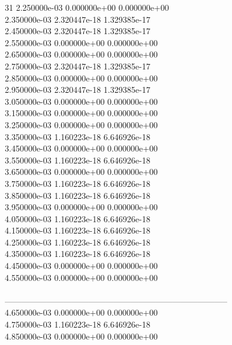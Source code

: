 31	2.250000e-03	0.000000e+00	0.000000e+00	\\ 	2.350000e-03	2.320447e-18	1.329385e-17	\\ 	2.450000e-03	2.320447e-18	1.329385e-17	\\ 	2.550000e-03	0.000000e+00	0.000000e+00	\\ 	2.650000e-03	0.000000e+00	0.000000e+00	\\ 	2.750000e-03	2.320447e-18	1.329385e-17	\\ 	2.850000e-03	0.000000e+00	0.000000e+00	\\ 	2.950000e-03	2.320447e-18	1.329385e-17	\\ 	3.050000e-03	0.000000e+00	0.000000e+00	\\ 	3.150000e-03	0.000000e+00	0.000000e+00	\\ 	3.250000e-03	0.000000e+00	0.000000e+00	\\ 	3.350000e-03	1.160223e-18	6.646926e-18	\\ 	3.450000e-03	0.000000e+00	0.000000e+00	\\ 	3.550000e-03	1.160223e-18	6.646926e-18	\\ 	3.650000e-03	0.000000e+00	0.000000e+00	\\ 	3.750000e-03	1.160223e-18	6.646926e-18	\\ 	3.850000e-03	1.160223e-18	6.646926e-18	\\ 	3.950000e-03	0.000000e+00	0.000000e+00	\\ 	4.050000e-03	1.160223e-18	6.646926e-18	\\ 	4.150000e-03	1.160223e-18	6.646926e-18	\\ 	4.250000e-03	1.160223e-18	6.646926e-18	\\ 	4.350000e-03	1.160223e-18	6.646926e-18	\\ 	4.450000e-03	0.000000e+00	0.000000e+00	\\ 	4.550000e-03	0.000000e+00	0.000000e+00	\\ \hline
\\ \hline
--------------------------------------------------------------------------------\\ 	4.650000e-03	0.000000e+00	0.000000e+00	\\ 	4.750000e-03	1.160223e-18	6.646926e-18	\\ 	4.850000e-03	0.000000e+00	0.000000e+00	\\ \hline
